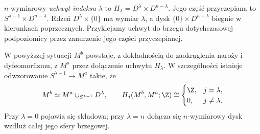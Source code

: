 \begin{definicja}
\label{def:uchwyt-morse-17}
$n$-wymiarowy \emph{uchwyt indeksu $\lambda$}
to $H_\lambda=D^\lambda\times D^{n-\lambda}$.
Jego część przyczepiana to
$S^{\lambda-1}\times D^{n-\lambda}$.
Rdzeń $D^\lambda\times\{0\}$ ma
wymiar $\lambda$, a dysk
$\{0\}\times D^{n-\lambda}$ biegnie
w kierunkach poprzecznych.
Przyklejamy uchwyt do brzegu
dotychczasowej podpoziomicy
przez zanurzenie jego części przyczepianej.
\end{definicja}

\begin{twierdzenie}
\label{thm:uchwyt-morse-17}
W powyższej sytuacji $M^b$ powstaje,
z dokładnością do zaokrąglenia naroży
i dyfeomorfizmu, z $M^a$ przez
dołączenie uchwytu $H_\lambda$.
W szczególności istnieje odwzorowanie
$S^{\lambda-1}\to M^a$ takie, że
\begin{equation}\label{eq:komorka-morse-17}
 M^b\simeq M^a\cup_{S^{\lambda-1}}D^\lambda,
 \qquad
 H_j(M^b,M^a;\Z)\cong
 \begin{cases}\Z,&j=\lambda,\\0,&j\ne\lambda.
 \end{cases}
\end{equation}
Przy $\lambda=0$ pojawia się składowa;
przy $\lambda=n$ dołącza się
$n$-wymiarowy dysk wzdłuż całej
jego sfery brzegowej.
\end{twierdzenie}
